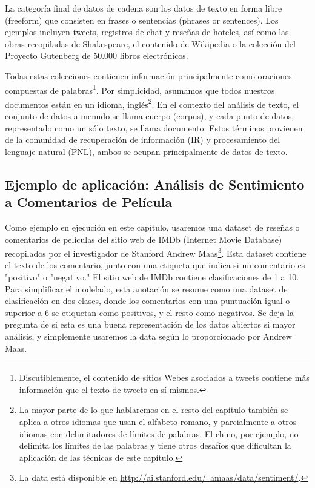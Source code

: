 La categoría final de  datos de cadena son los datos de texto en forma libre (freeform) que consisten en frases o sentencias  (phrases or sentences). Los ejemplos incluyen tweets, registros de chat y reseñas de hoteles, así como las obras recopiladas de Shakespeare, el contenido de Wikipedia o la colección del Proyecto Gutenberg de 50.000 libros electrónicos.


 Todas estas colecciones contienen información principalmente como oraciones compuestas de palabras\footnote{Discutiblemente, el contenido de sitios Webes asociados a tweets contiene más información que el texto de tweets en sí mismos.}. Por simplicidad, asumamos que todos nuestros documentos están en un idioma, inglés\footnote{La mayor parte de lo que hablaremos en el resto del capítulo también se aplica a otros idiomas que usan el alfabeto romano, y parcialmente a otros idiomas con delimitadores de límites de palabras. El chino, por ejemplo, no  delimita los límites de las palabras y tiene otros desafíos que dificultan la aplicación de las técnicas de este capítulo.}. En el contexto del análisis de texto, el conjunto de datos a menudo se llama cuerpo (corpus), y cada punto de datos, representado como un sólo texto, se llama documento. Estos términos provienen de la comunidad de recuperación de información (IR) y procesamiento del lenguaje natural (PNL), ambos  se ocupan principalmente de datos de texto.

 
\subsection{Ejemplo de aplicación:  Análisis de Sentimiento a Comentarios de Película}
   
  

Como ejemplo en ejecución en este capítulo, usaremos una dataset de reseñas o comentarios de películas
 del sitio web de IMDb (Internet Movie Database) recopilados por el investigador de   Stanford Andrew Maas\footnote{La data está disponible en   
 \href{http://ai.stanford.edu/~amaas/data/sentiment/}{\color{vino} http://ai.stanford.edu/~amaas/data/sentiment/}.}.   Esta dataset  contiene el texto de los comentario, junto con una etiqueta que indica si un  comentario es "{}positivo"{}  o  "{}negativo."{}   El sitio web de IMDb contiene clasificaciones de 1 a 10. Para simplificar el modelado, esta anotación se resume como una  dataset de clasificación en dos clases, donde los comentarios con una puntuación igual o superior a 6 se etiquetan como positivos, y el resto como negativos. Se deja  la pregunta de si esta es una buena representación de los datos abiertos si mayor análisis, y simplemente usaremos la data según lo proporcionado por Andrew Maas.\\

